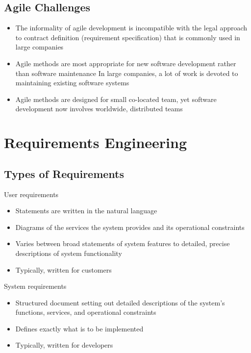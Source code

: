 \documentclass{article}
\begin{document}
    \subsection*{Agile Challenges}

    \begin{itemize}
        \item 
        The informality of agile development is incompatible with the legal approach to contract definition (requirement specification) that is commonly used in large companies
        \item
        Agile methods are most appropriate for new software development rather than software maintenance
        In large companies, a lot of work is devoted to maintaining existing software systems
        \item
        Agile methods are designed for small co-located team, yet software development now involves worldwide, distributed teams
    \end{itemize}

    \section*{Requirements Engineering}

    \subsection*{Types of Requirements}

    User requirements
    \begin{itemize}
        \item 
        Statements are written in the natural language
        \item
        Diagrams of the services the system provides and its operational constraints
        \item
        Varies between broad statements of system features to detailed, precise descriptions of system functionality
        \item
        Typically, written for customers
    \end{itemize}

    System requirements
    \begin{itemize}
        \item 
        Structured document setting out detailed descriptions of the system’s functions, services, and operational constraints
        \item
        Defines exactly what is to be implemented
        \item
        Typically, written for developers
    \end{itemize}
\end{document}
